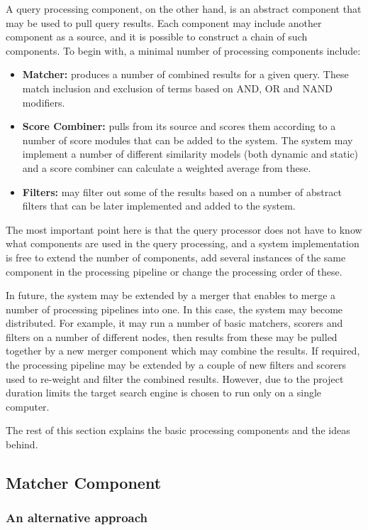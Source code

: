 A query processing component, on the other hand, is an abstract component that may be used to pull query results. Each component may include another component as a source, and it is possible to construct a chain of such components. To begin with, a minimal number of processing components include:
\begin{itemize}
	\item {\bf Matcher:} produces a number of combined results for a given query. These match inclusion and exclusion of terms based on AND, OR and NAND modifiers.
	\item {\bf Score Combiner:} pulls from its source and scores them according to a number of score modules that can be added to the system. The system may implement a number of different similarity models (both dynamic and static) and a score combiner can calculate a weighted average from these.
	\item {\bf Filters:} may filter out some of the results based on a number of abstract filters that can be later implemented and added to the system.
\end{itemize}

The most important point here is that the query processor does not have to know what components are used in the query processing, and a system implementation is free to extend the number of components, add several instances of the same component in the processing pipeline or change the processing order of these. 

In future, the system may be extended by a merger that enables to merge a number of processing pipelines into one. In this case, the system may become distributed. For example, it may run a number of basic matchers, scorers and filters on a number of different nodes, then results from these may be pulled together by a new merger component which may combine the results. If required, the processing pipeline may be extended by a couple of new filters and scorers used to re-weight and filter the combined results. However, due to the project duration limits the target search engine is chosen to run only on a single computer.

The rest of this section explains the basic processing components and the ideas behind.

\subsection{Matcher Component}

\subsubsection{An alternative approach}

